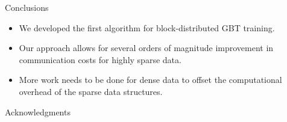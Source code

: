 \documentclass[final]{beamer}
\newlength{\onecolwid}
\begin{document}
\begin{frame}[t]
\begin{columns}[t]
\begin{column}{\onecolwid}
\begin{block}{Conclusions}
		\begin{itemize}
			\item We developed the first algorithm for block-distributed GBT training.
			\item Our approach allows for several orders of magnitude improvement in
				communication costs for highly sparse data.
			\item More work needs to be done for dense data to offset the computational
				overhead of the sparse data structures.
		\end{itemize}
		
	\end{block}
	
	
	
	
	
	
	\begin{block}{Acknowledgments}
	
	\small{} \\
	
	\end{block}
	
	
	

\end{column}
\end{columns}
\end{frame}
\end{document}
